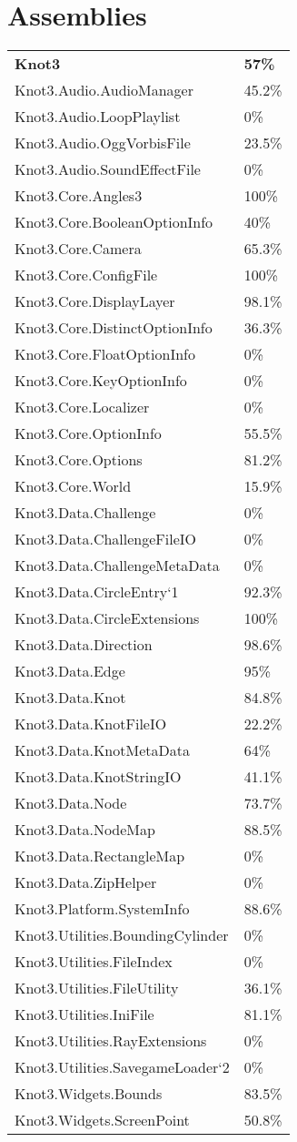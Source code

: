 \documentclass[a4paper,10pt]{article}
\begin{document}
\section{Assemblies}
\begin{longtable}[l]{ll}
\textbf{Knot3} & \textbf{57\%}\\
Knot3.Audio.AudioManager & 45.2\%\\
Knot3.Audio.LoopPlaylist & 0\%\\
Knot3.Audio.OggVorbisFile & 23.5\%\\
Knot3.Audio.SoundEffectFile & 0\%\\
Knot3.Core.Angles3 & 100\%\\
Knot3.Core.BooleanOptionInfo & 40\%\\
Knot3.Core.Camera & 65.3\%\\
Knot3.Core.ConfigFile & 100\%\\
Knot3.Core.DisplayLayer & 98.1\%\\
Knot3.Core.DistinctOptionInfo & 36.3\%\\
Knot3.Core.FloatOptionInfo & 0\%\\
Knot3.Core.KeyOptionInfo & 0\%\\
Knot3.Core.Localizer & 0\%\\
Knot3.Core.OptionInfo & 55.5\%\\
Knot3.Core.Options & 81.2\%\\
Knot3.Core.World & 15.9\%\\
Knot3.Data.Challenge & 0\%\\
Knot3.Data.ChallengeFileIO & 0\%\\
Knot3.Data.ChallengeMetaData & 0\%\\
Knot3.Data.CircleEntry`1 & 92.3\%\\
Knot3.Data.CircleExtensions & 100\%\\
Knot3.Data.Direction & 98.6\%\\
Knot3.Data.Edge & 95\%\\
Knot3.Data.Knot & 84.8\%\\
Knot3.Data.KnotFileIO & 22.2\%\\
Knot3.Data.KnotMetaData & 64\%\\
Knot3.Data.KnotStringIO & 41.1\%\\
Knot3.Data.Node & 73.7\%\\
Knot3.Data.NodeMap & 88.5\%\\
Knot3.Data.RectangleMap & 0\%\\
Knot3.Data.ZipHelper & 0\%\\
Knot3.Platform.SystemInfo & 88.6\%\\
Knot3.Utilities.BoundingCylinder & 0\%\\
Knot3.Utilities.FileIndex & 0\%\\
Knot3.Utilities.FileUtility & 36.1\%\\
Knot3.Utilities.IniFile & 81.1\%\\
Knot3.Utilities.RayExtensions & 0\%\\
Knot3.Utilities.SavegameLoader`2 & 0\%\\
Knot3.Widgets.Bounds & 83.5\%\\
Knot3.Widgets.ScreenPoint & 50.8\%\\
\end{longtable}
\newpage
\end{document}
